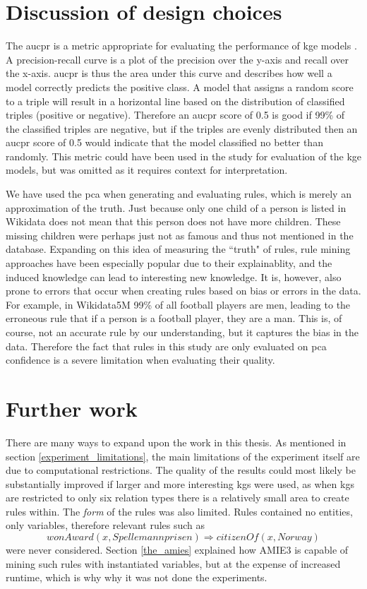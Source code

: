 \section{Discussion of design choices}
The \gls{aucpr} is a metric appropriate for evaluating the performance of \gls{kge} models \cite{jahn2021reasoning}. A precision-recall curve is a plot of the precision over the y-axis and recall over the x-axis. \gls{aucpr} is thus the area under this curve and describes how well a model correctly predicts the positive class. A model that assigns a random score to a triple will result in a horizontal line based on the distribution of classified triples (positive or negative). Therefore an \gls{aucpr} score of 0.5 is good if 99\% of the classified triples are negative, but if the triples are evenly distributed then an \gls{aucpr} score of 0.5 would indicate that the model classified no better than randomly. This metric could have been used in the study for evaluation of the \gls{kge} models, but was omitted as it requires context for interpretation.

We have used the \gls{pca} when generating and evaluating rules, which is merely an approximation of the truth. Just because only one child of a person is listed in Wikidata does not mean that this person does not have more children. These missing children were perhaps just not as famous and thus not mentioned in the database. Expanding on this idea of measuring the ``truth" of rules, rule mining approaches have been especially popular due to their explainablity, and the induced knowledge can lead to interesting new knowledge. It is, however, also prone to errors that occur when creating rules based on bias or errors in the data. For example, in Wikidata5M 99\% of all football players are men, leading to the erroneous rule that if a person is a football player, they are a man. This is, of course, not an accurate rule by our understanding, but it captures the bias in the data. Therefore the fact that rules in this study are only evaluated on \gls{pca} confidence is a severe limitation when evaluating their quality.

\section{Further work}
There are many ways to expand upon the work in this thesis. As mentioned in section \ref{experiment_limitations}, the main limitations of the experiment itself are due to computational restrictions. The quality of the results could most likely be substantially improved if larger and more interesting \glspl{kg} were used, as when \glspl{kg} are restricted to only six relation types there is a relatively small area to create rules within. The \textit{form} of the rules was also limited. Rules contained no entities, only variables, therefore relevant rules such as
\[wonAward(x, Spellemannprisen) \Rightarrow citizenOf(x, Norway)\]
were never considered. Section \ref{the_amies} explained how AMIE3 is capable of mining such rules with instantiated variables, but at the expense of increased runtime, which is why why it was not done the experiments.

